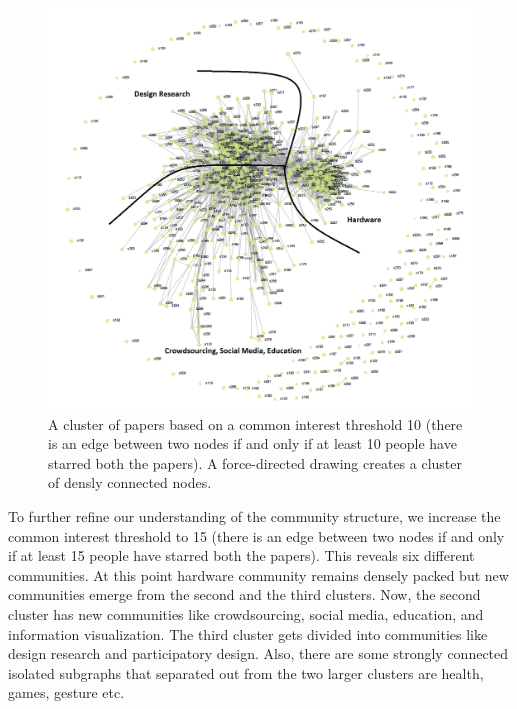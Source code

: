\documentclass{sigchi}
\begin{document}
\begin{figure}[!h]
\centering
\includegraphics[width=0.9\columnwidth]{mychi-community-view-10}
\caption{A cluster of papers based on a common interest threshold 10 (there is an edge between two nodes if and only if at least 10 people have starred both the papers). A force-directed drawing creates a cluster of densly connected nodes. }
\label{fig:Community View of threshold 10}
\end{figure}

To further refine our understanding of the community structure, we increase the common interest threshold to 15 (there is an edge between two nodes if and only if at least 15 people have starred both the papers). This reveals six different communities. At this point hardware community remains densely packed but new communities emerge from the second and the third clusters. Now, the second cluster has new communities like crowdsourcing, social media, education, and information visualization. The third cluster gets divided into communities like design research and participatory design. Also, there are some strongly connected isolated subgraphs that separated out from the two larger clusters are health, games, gesture etc.
\end{document}
